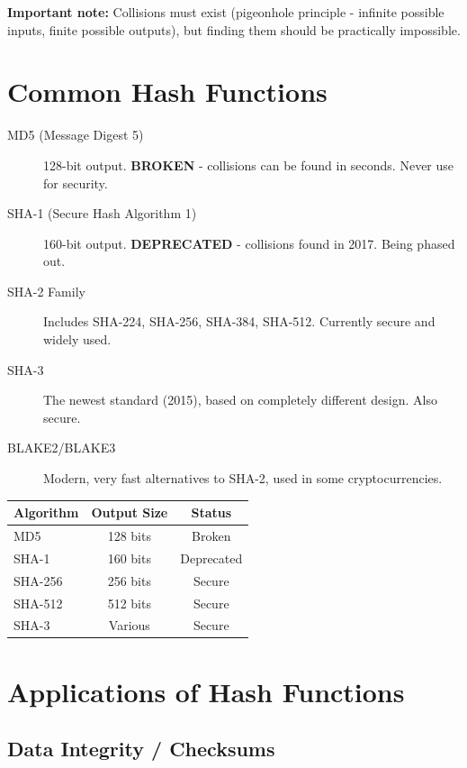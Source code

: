 \documentclass[11pt,a4paper]{report}
\begin{document}
\textbf{Important note:} Collisions must exist (pigeonhole principle - infinite possible inputs, finite possible outputs), but finding them should be practically impossible.

\section{Common Hash Functions}

\begin{description}
\item[MD5 (Message Digest 5)] 128-bit output. \textbf{BROKEN} - collisions can be found in seconds. Never use for security.

\item[SHA-1 (Secure Hash Algorithm 1)] 160-bit output. \textbf{DEPRECATED} - collisions found in 2017. Being phased out.

\item[SHA-2 Family] Includes SHA-224, SHA-256, SHA-384, SHA-512. Currently secure and widely used.

\item[SHA-3] The newest standard (2015), based on completely different design. Also secure.

\item[BLAKE2/BLAKE3] Modern, very fast alternatives to SHA-2, used in some cryptocurrencies.
\end{description}

\begin{center}
\begin{tabular}{|l|c|c|}
\hline
\textbf{Algorithm} & \textbf{Output Size} & \textbf{Status} \\
\hline
MD5 & 128 bits & Broken \\
SHA-1 & 160 bits & Deprecated \\
SHA-256 & 256 bits & Secure \\
SHA-512 & 512 bits & Secure \\
SHA-3 & Various & Secure \\
\hline
\end{tabular}
\end{center}

\section{Applications of Hash Functions}

\subsection{Data Integrity / Checksums}
\end{document}
